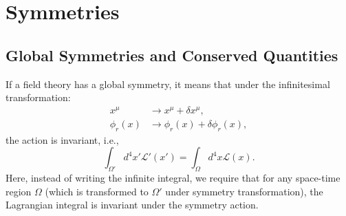 \section{Symmetries}

\subsection{Global Symmetries and Conserved Quantities}
If a field theory has a global symmetry, it means that under the infinitesimal transformation:
\begin{equation*}
\begin{aligned}
	x^{\mu} & \rightarrow x^{\mu}+\delta x^{\mu},\\
	\phi_{r}\left(x\right) & \rightarrow \phi_{r}\left(x\right)+\delta\phi_{r}\left(x\right),
\end{aligned}
\end{equation*}
the action is invariant, i.e.,
\begin{equation}
	\int_{\Omega'}d^{4}x'\mathcal{L}'\left(x'\right)=\int_{\Omega}d^{4}x\mathcal{L}\left(x\right).
\end{equation}
Here, instead of writing the infinite integral, we require that for any space-time region $\Omega$ (which is transformed to $\Omega'$ under symmetry transformation), the Lagrangian integral is invariant under the symmetry action.




